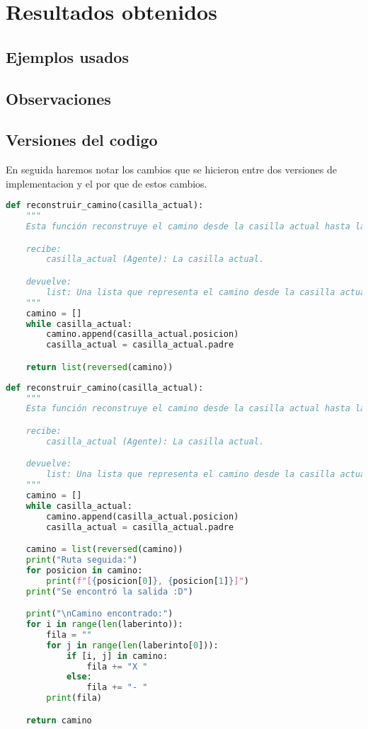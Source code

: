 \section{Resultados obtenidos}

\subsection*{Ejemplos usados}

\subsection*{Observaciones}


\subsection*{Versiones del codigo}

En seguida haremos notar los cambios que se hicieron entre dos versiones de implementacion y el por que de estos cambios.

\begin{lstlisting}[language=Python, caption=Version 1: reconstruir_camino]
    def reconstruir_camino(casilla_actual):
    """
    Esta función reconstruye el camino desde la casilla actual hasta la posición inicial del agente.

    recibe:
        casilla_actual (Agente): La casilla actual.

    devuelve:
        list: Una lista que representa el camino desde la casilla actual hasta la posición inicial del agente.
    """
    camino = []
    while casilla_actual:
        camino.append(casilla_actual.posicion)
        casilla_actual = casilla_actual.padre

    return list(reversed(camino))
\end{lstlisting}

\begin{lstlisting}[language=Python, caption=Version 2: reconstruir_camino]
    def reconstruir_camino(casilla_actual):
    """
    Esta función reconstruye el camino desde la casilla actual hasta la posición inicial del agente.

    recibe:
        casilla_actual (Agente): La casilla actual.

    devuelve:
        list: Una lista que representa el camino desde la casilla actual hasta la posición inicial del agente.
    """
    camino = []
    while casilla_actual:
        camino.append(casilla_actual.posicion)
        casilla_actual = casilla_actual.padre

    camino = list(reversed(camino))
    print("Ruta seguida:")
    for posicion in camino:
        print(f"[{posicion[0]}, {posicion[1]}]")
    print("Se encontró la salida :D")  

    print("\nCamino encontrado:")
    for i in range(len(laberinto)):
        fila = ""
        for j in range(len(laberinto[0])):
            if [i, j] in camino:
                fila += "X "
            else:
                fila += "- "
        print(fila)

    return camino
\end{lstlisting}

